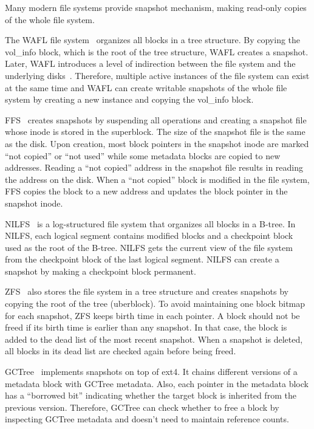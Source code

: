 Many modern file systems provide snapshot mechanism, making read-only copies of
the whole file system.

The WAFL file system~\citep{wafl} organizes all blocks in a tree structure.
By copying the vol\_info block, which is the root of the tree structure, WAFL
creates a snapshot.
Later, WAFL introduces a level of indirection between the file system and the
underlying disks~\citep{wafl-flexvol}.
Therefore, multiple active instances of the file system can exist at the same
time and WAFL can create writable snapshots of the whole file system by creating
a new instance and copying the vol\_info block.

FFS~\citep{ffs1,ffs2} creates snapshots by suspending all operations and creating a
snapshot file whose inode is stored in the superblock.
The size of the snapshot file is the same as the disk.
Upon creation, most block pointers in the snapshot inode are marked
``not copied'' or ``not used'' while some metadata blocks are copied to new
addresses.
Reading a ``not copied'' address in the snapshot file results in reading the
address on the disk.
When a ``not copied'' block is modified in the file system, FFS copies the block
to a new address and updates the block pointer in the snapshot inode.

NILFS~\citep{nilfs2} is a log-structured file system that organizes all blocks
in a B-tree.
In NILFS, each logical segment contains modified blocks and a checkpoint block
used as the root of the B-tree.
NILFS gets the current view of the file system from the checkpoint block
of the last logical segment.
NILFS can create a snapshot by making a checkpoint block permanent.

ZFS~\citep{zfs} also stores the file system in a tree structure and creates
snapshots by copying the root of the tree (uberblock).
To avoid maintaining one block bitmap for each snapshot, ZFS keeps birth time
in each pointer.
A block should not be freed if its birth time is earlier than any snapshot.
In that case, the block is added to the dead list of the most recent snapshot.
When a snapshot is deleted, all blocks in its dead list are checked again before
being freed.

GCTree~\citep{gctree} implements snapshots on top of ext4.
It chains different versions of a metadata block with GCTree metadata.
Also, each pointer in the metadata block has a ``borrowed bit'' indicating
whether the target block is inherited from the previous version.
Therefore, GCTree can check whether to free a block by inspecting GCTree
metadata and doesn't need to maintain reference counts.


